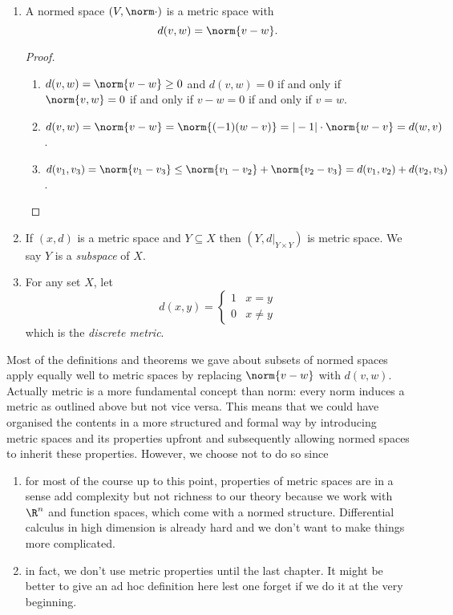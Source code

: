 \documentclass[a4paper]{article}
\theoremstyle{definition}
\begin{document}
\begin{eg}\leavevmode
  \begin{enumerate}
  \item A normed space \((V, \norm \cdot)\) is a metric space with
    \[
      d(v, w) = \norm{v - w}.
    \]

    \begin{proof}\leavevmode
      \begin{enumerate}
      \item \(d(v, w) = \norm{v - w} \geq 0\) and \(d(v, w) = 0\) if and only if \(\norm{v, w} = 0\) if and only if \(v - w = 0\) if and only if \(v = w\).
      \item \(d(v, w) = \norm{v - w} = \norm{(-1)(w - v)} = |-1| \cdot \norm{w - v} = d(w, v)\).
      \item \(d(v_1, v_3) = \norm{v_1 - v_3} \leq \norm{v_1 - v_2} + \norm{v_2 - v_3} = d(v_1, v_2) + d(v_2, v_3)\).
      \end{enumerate}
    \end{proof}
  \item If \((x, d)\) is a metric space and \(Y \subseteq X\) then \((Y, d|_{Y \times Y})\) is metric space. We say \(Y\) is a \emph{subspace} of \(X\).
  \item For any set \(X\), let
    \[
      d(x, y) =
      \begin{cases}
        1 & x = y \\
        0 & x \neq y
      \end{cases}
    \]
    which is the \emph{discrete metric}.
  \end{enumerate}
\end{eg}

Most of the definitions and theorems we gave about subsets of normed spaces apply equally well to metric spaces by replacing \(\norm{v - w}\) with \(d(v, w)\). Actually metric is a more fundamental concept than norm: every norm induces a metric as outlined above but not vice versa. This means that we could have organised the contents in a more structured and formal way by introducing metric spaces and its properties upfront and subsequently allowing normed spaces to inherit these properties. However, we choose not to do so since

\begin{enumerate}
\item for most of the course up to this point, properties of metric spaces are in a sense add complexity but not richness to our theory because we work with \(\R^n\) and function spaces, which come with a normed structure. Differential calculus in high dimension is already hard and we don't want to make things more complicated.
\item in fact, we don't use metric properties until the last chapter. It might be better to give an ad hoc definition here lest one forget if we do it at the very beginning.
\end{enumerate}
\end{document}
